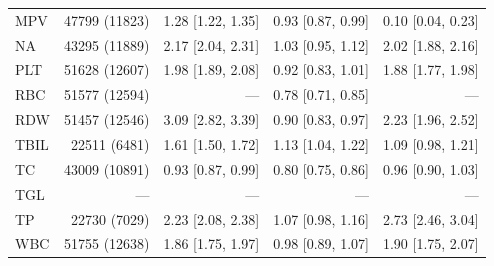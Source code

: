 \begin{table}[ht]
\begin{tabular}{lrrrr}
MPV & 47799 (11823) & 1.28 [1.22, 1.35] & 0.93 [0.87, 0.99] & 0.10 [0.04, 0.23] \\
NA & 43295 (11889) & 2.17 [2.04, 2.31] & 1.03 [0.95, 1.12] & 2.02 [1.88, 2.16] \\
PLT & 51628 (12607) & 1.98 [1.89, 2.08] & 0.92 [0.83, 1.01] & 1.88 [1.77, 1.98] \\
RBC & 51577 (12594) & --- & 0.78 [0.71, 0.85] & --- \\
RDW & 51457 (12546) & 3.09 [2.82, 3.39] & 0.90 [0.83, 0.97] & 2.23 [1.96, 2.52] \\
TBIL & 22511 (6481) & 1.61 [1.50, 1.72] & 1.13 [1.04, 1.22] & 1.09 [0.98, 1.21] \\
TC & 43009 (10891) & 0.93 [0.87, 0.99] & 0.80 [0.75, 0.86] & 0.96 [0.90, 1.03] \\
TGL & --- & --- & --- & --- \\
TP & 22730 (7029) & 2.23 [2.08, 2.38] & 1.07 [0.98, 1.16] & 2.73 [2.46, 3.04] \\
WBC & 51755 (12638) & 1.86 [1.75, 1.97] & 0.98 [0.89, 1.07] & 1.90 [1.75, 2.07] \\
\bottomrule
\end{tabular}
\label{tab:13_cox_chs_mortality}
\end{table}